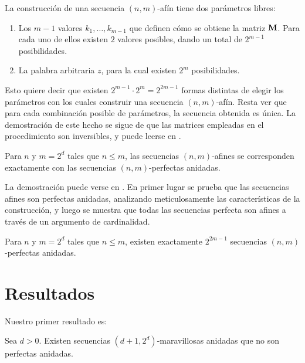 \documentclass[11pt]{article}
\begin{document}
\begin{demosketch}
	La construcción de una secuencia $(n,m)$-afín tiene dos parámetros libres:
	\begin{enumerate}
		\item Los $m - 1$ valores $k_1,\dots,k_{m - 1}$ que definen cómo se
		      obtiene la matriz $\mathbf{M}$. Para cada uno de ellos existen $2$
		      valores posibles, dando un total de $2^{m - 1}$ posibilidades.
		\item La palabra arbitraria $z$, para la cual existen $2^m$
		      posibilidades.
	\end{enumerate}
	Esto quiere decir que existen $2^{m - 1}\cdot2^m = 2^{2m - 1}$
	formas distintas de elegir los parámetros con los cuales construir una
	secuencia $(n,m)$-afín. Resta ver que para cada combinación posible de
	parámetros, la secuencia obtenida es única. La demostración de este hecho se
	sigue de que las matrices empleadas en el procedimiento son inversibles,
	y puede leerse en \cite{BECHER2019101403}.
\end{demosketch}

\begin{teo}
	Para $n$ y $m = 2^d$ tales que $n \leq m$, las secuencias $(n,m)$-afines se
	corresponden exactamente con las secuencias $(n,m)$-perfectas anidadas.
\end{teo}

\begin{demosketch}
	La demostración puede verse en \cite{BECHER2019101403}. En primer lugar se
	prueba que las secuencias afines son perfectas anidadas, analizando
	meticulosamente las características de la construcción, y luego se muestra
	que todas las secuencias perfecta son afines a través de un argumento de
	cardinalidad.
\end{demosketch}

\begin{coro}
	Para $n$ y $m = 2^d$ tales que $n \leq m$, existen exactamente $2^{2m - 1}$
	secuencias $(n,m)$-perfectas anidadas.
\end{coro}

\section{Resultados}

Nuestro primer resultado es:

\begin{teo}
	\label{teo:existencia}
	Sea $d > 0$. Existen secuencias $(d + 1, 2^d)$-maravillosas anidadas que no son perfectas anidadas.
\end{teo}
\end{document}

